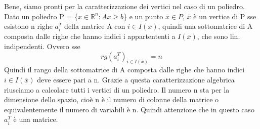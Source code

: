 \vspace{1cm}

\noindent Bene, siamo pronti per la caratterizzazione dei vertici nel caso di un poliedro. Dato un poliedro P = \{$x \in \mathbb{R}^n: Ax \geq b$\} e un punto $\bar{x} \in P$, $\bar{x}$ è un vertice di P sse esistono n righe $a_i^T$ della matrice A con $i \in I(\bar{x})$, quindi una sottomatrice di A composta dalle righe che hanno indici i appartententi a $I(\bar{x})$, che sono lin. indipendenti. Ovvero sse
\begin{equation*}
    rg(a_i^T)_{i \in I(\bar{x})} = n
\end{equation*}
Quindi il rango della sottomatrice di A composta dalle righe che hanno indici $i \in I(\bar{x})$ deve essere pari a n. Grazie a questa caratterizzazione algebrica riusciamo a calcolare tutti i vertici di un poliedro. Il numero n sta per la dimensione dello spazio, cioè n è il numero di colonne della matrice o equivalentemente il numero di variabili è n. Quindi attenzione che in questo caso $a_i^T$ è una matrice.


